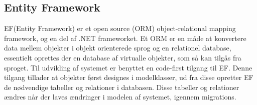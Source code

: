 \subsection{Entity Framework}
EF(Entity Framework) er et open source (ORM) object-relational mapping framework, og en del af .NET frameworket.
Et ORM er en måde at konvertere data mellem  objekter i objekt orienterede sprog og en relationel database, essentielt oprettes der en database af virtualle objekter, som så kan tilgås fra sproget.
Til udvikling af systemet er benyttet en code-first tilgang til EF.
Denne tilgang tillader at objekter først designes i modelklasser, ud fra disse opretter EF de nødvendige tabeller og relationer i databasen.
Disse tabeller og relationer ændres når der laves ændringer i modelen af systemet, igennem migrations.













